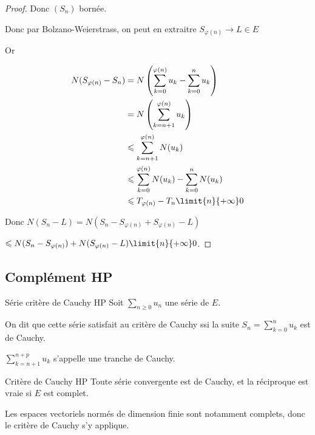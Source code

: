 \begin{proof}
    Donc $(S_n)$ bornée. 

    Donc par Bolzano-Weierstrass, on peut en extraitre $S_{\varphi(n)} \to L \in E$

    Or 

    \begin{align*}
        N(S_{\varphi(n)} - S_n) & = N\left( \sum_{k = 0 }^{\varphi(n)} u_k - \sum_{k = 0 }^{n } u_k \right) \\
                                & = N \left( \sum_{k = n + 1 }^{\varphi(n)} u_k \right) \\
                                & \leqslant \sum_{k = n + 1 }^{\varphi(n)} N(u_k) \\
                                & \leqslant \sum_{k = 0 }^{\varphi(n) } N(u_k) - \sum_{k = 0 }^{n } N(u_k) \\
                                & \leqslant T_{\varphi(n)} - T_n \limit{n}{+ \infty} 0
    \end{align*}

    Donc $N(S_n - L) = N(S_n - S_{\varphi(n)} + S_{\varphi(n)} - L)$

    \qquad \qquad \qquad $ \leqslant N(S_n - S_{\varphi(n)}) + N(S_{\varphi(n)} - L) \limit{n}{+ \infty} 0$.
\end{proof}

\subsection{Complément HP }

\begin{definition}{Série critère de Cauchy HP}{}
    Soit $\sum_{n \geqslant 0} u_n$ une série de $E$.

    On dit que cette série satisfait au critère de Cauchy ssi la suite $\displaystyle S_n = \sum_{k = 0}^n u_k$ 
    est de Cauchy. 

    $\displaystyle \sum_{k = n + 1}^{n + p} u_k$ s'appelle une tranche de Cauchy. 
\end{definition}

\begin{theoreme}{Critère de Cauchy HP}{}
    Toute série convergente est de Cauchy, et la réciproque est vraie si $E$ est complet.
\end{theoreme}

\begin{remarque}
    Les espaces vectoriels normés de dimension finie sont notamment complets, donc 
    le critère de Cauchy s'y applique.
\end{remarque}


